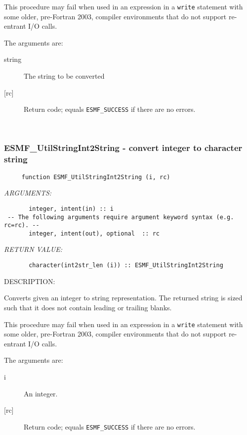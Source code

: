      This procedure may fail when used in an expression in a {\tt write} statement
     with some older, pre-Fortran 2003, compiler environments that do not support
     re-entrant I/O calls.
  
     The arguments are:
     \begin{description}
     \item[string]
       The string to be converted
     \item[{[rc]}]
       Return code; equals {\tt ESMF\_SUCCESS} if there are no errors.
     \end{description}
   
 
\mbox{}\hrulefill\ 
 
\subsubsection [ESMF\_UtilStringInt2String] {ESMF\_UtilStringInt2String - convert integer to character string}


  
\begin{verbatim}     function ESMF_UtilStringInt2String (i, rc)\end{verbatim}{\em ARGUMENTS:}
\begin{verbatim}       integer, intent(in) :: i
 -- The following arguments require argument keyword syntax (e.g. rc=rc). --
       integer, intent(out), optional  :: rc\end{verbatim}{\em RETURN VALUE:}
\begin{verbatim}       character(int2str_len (i)) :: ESMF_UtilStringInt2String
 \end{verbatim}
{\sf DESCRIPTION:\\ }


     Converts given an integer to string representation.  The returned string is
     sized such that it does not contain leading or trailing blanks.
  
     This procedure may fail when used in an expression in a {\tt write} statement
     with some older, pre-Fortran 2003, compiler environments that do not support
     re-entrant I/O calls.
  
       The arguments are:
       \begin{description}
       \item[i]
         An integer.
       \item[{[rc]}]
         Return code; equals {\tt ESMF\_SUCCESS} if there are no errors.
       \end{description}
  
